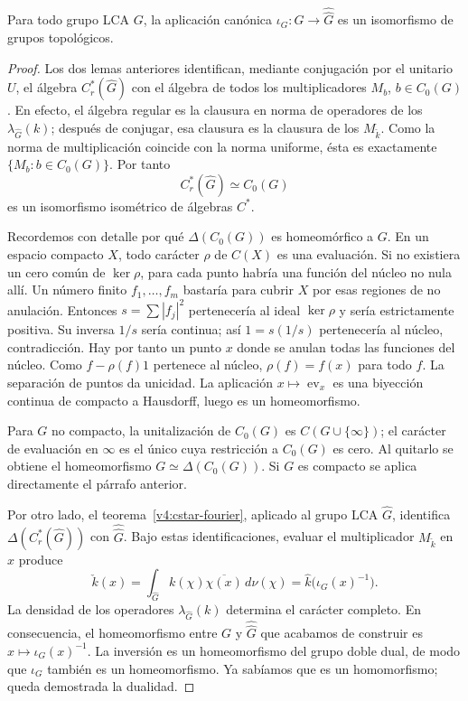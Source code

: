 \begin{teorema}\label{v4:pontryagin}
Para todo grupo LCA $G$, la aplicación canónica $\iota_G:G\to\widehat{\widehat G}$ es un isomorfismo de grupos topológicos.
\end{teorema}
\begin{proof}
Los dos lemas anteriores identifican, mediante conjugación por el unitario $U$, el álgebra $C_r^*(\widehat G)$ con el álgebra de todos los multiplicadores $M_b$, $b\in C_0(G)$. En efecto, el álgebra regular es la clausura en norma de operadores de los $\lambda_{\widehat G}(k)$; después de conjugar, esa clausura es la clausura de los $M_{\check k}$. Como la norma de multiplicación coincide con la norma uniforme, ésta es exactamente $\{M_b:b\in C_0(G)\}$. Por tanto
\[
 C_r^*(\widehat G)\simeq C_0(G)
\]
es un isomorfismo isométrico de álgebras $C^*$.

Recordemos con detalle por qué $\Delta(C_0(G))$ es homeomórfico a $G$. En un espacio compacto $X$, todo carácter $\rho$ de $C(X)$ es una evaluación. Si no existiera un cero común de $\ker\rho$, para cada punto habría una función del núcleo no nula allí. Un número finito $f_1,\ldots,f_m$ bastaría para cubrir $X$ por esas regiones de no anulación. Entonces $s=\sum|f_j|^2$ pertenecería al ideal $\ker\rho$ y sería estrictamente positiva. Su inversa $1/s$ sería continua; así $1=s(1/s)$ pertenecería al núcleo, contradicción. Hay por tanto un punto $x$ donde se anulan todas las funciones del núcleo. Como $f-\rho(f)1$ pertenece al núcleo, $\rho(f)=f(x)$ para todo $f$. La separación de puntos da unicidad. La aplicación $x\mapsto\operatorname{ev}_x$ es una biyección continua de compacto a Hausdorff, luego es un homeomorfismo.

Para $G$ no compacto, la unitalización de $C_0(G)$ es $C(G\cup\{\infty\})$; el carácter de evaluación en $\infty$ es el único cuya restricción a $C_0(G)$ es cero. Al quitarlo se obtiene el homeomorfismo $G\simeq\Delta(C_0(G))$. Si $G$ es compacto se aplica directamente el párrafo anterior.

Por otro lado, el teorema~\ref{v4:cstar-fourier}, aplicado al grupo LCA $\widehat G$, identifica $\Delta(C_r^*(\widehat G))$ con $\widehat{\widehat G}$. Bajo estas identificaciones, evaluar el multiplicador $M_{\check k}$ en $x$ produce
\[
 \check k(x)=\int_{\widehat G}k(\chi)\overline{\chi(x)}\,d\nu(\chi)
 =\widehat k\bigl(\iota_G(x)^{-1}\bigr).
\]
La densidad de los operadores $\lambda_{\widehat G}(k)$ determina el carácter completo. En consecuencia, el homeomorfismo entre $G$ y $\widehat{\widehat G}$ que acabamos de construir es $x\mapsto\iota_G(x)^{-1}$. La inversión es un homeomorfismo del grupo doble dual, de modo que $\iota_G$ también es un homeomorfismo. Ya sabíamos que es un homomorfismo; queda demostrada la dualidad.
\end{proof}

